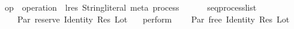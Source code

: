 \isamarkupfalse%
\ op\ {\isacharcolon}{\isacharcolon}\ {\isachardoublequoteopen}operation\ {\isasymRightarrow}\ {\isacharparenleft}lres{\isacharcomma}\ String{\isachardot}literal{\isacharcomma}\ meta{\isacharparenright}\ process{\isachardoublequoteclose}\isanewline
\ \ \ {\isachardoublequoteopen}\ \ {\isacharequal}\ seq{\isacharunderscore}process{\isacharunderscore}list\ \isacharbrackleft\isanewline
\ \ \ \ Par\ reserve\ {\isacharparenleft}Identity\ {\isacharparenleft}Res\ Lot{\isacharparenright}{\isacharparenright}\isanewline
\ \ {\isacharcomma}\ perform\ \isanewline
\ \ {\isacharcomma}\ Par\ free\ {\isacharparenleft}Identity\ {\isacharparenleft}Res\ Lot{\isacharparenright}{\isacharparenright}{\isacharbrackright}{\isachardoublequoteclose}
